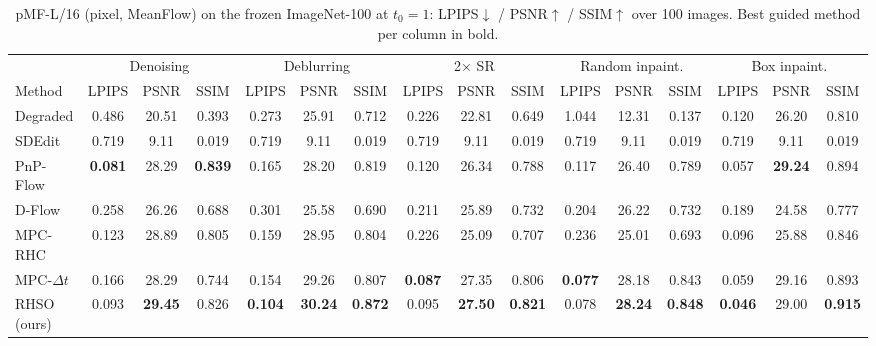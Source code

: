 
\begin{table}[t]
\centering
\small
\setlength{\tabcolsep}{3.5pt}
\caption{pMF-L/16 (pixel, MeanFlow) on the frozen ImageNet-100 at $t_0 = 1$: LPIPS$\downarrow$ / PSNR$\uparrow$ / SSIM$\uparrow$ over 100 images. Best guided method per column in bold.}
\label{tab:final_pmf}
\begin{tabular}{lccccccccccccccc}
\toprule
 & \multicolumn{3}{c}{Denoising} & \multicolumn{3}{c}{Deblurring} & \multicolumn{3}{c}{2$\times$ SR} & \multicolumn{3}{c}{Random inpaint.} & \multicolumn{3}{c}{Box inpaint.} \\
\cmidrule(lr){2-4} \cmidrule(lr){5-7} \cmidrule(lr){8-10} \cmidrule(lr){11-13} \cmidrule(lr){14-16}
Method & LPIPS & PSNR & SSIM & LPIPS & PSNR & SSIM & LPIPS & PSNR & SSIM & LPIPS & PSNR & SSIM & LPIPS & PSNR & SSIM \\
\midrule
Degraded & 0.486 & 20.51 & 0.393 & 0.273 & 25.91 & 0.712 & 0.226 & 22.81 & 0.649 & 1.044 & 12.31 & 0.137 & 0.120 & 26.20 & 0.810 \\
\midrule
SDEdit & 0.719 & 9.11 & 0.019 & 0.719 & 9.11 & 0.019 & 0.719 & 9.11 & 0.019 & 0.719 & 9.11 & 0.019 & 0.719 & 9.11 & 0.019 \\
PnP-Flow & \textbf{0.081} & 28.29 & \textbf{0.839} & 0.165 & 28.20 & 0.819 & 0.120 & 26.34 & 0.788 & 0.117 & 26.40 & 0.789 & 0.057 & \textbf{29.24} & 0.894 \\
D-Flow & 0.258 & 26.26 & 0.688 & 0.301 & 25.58 & 0.690 & 0.211 & 25.89 & 0.732 & 0.204 & 26.22 & 0.732 & 0.189 & 24.58 & 0.777 \\
MPC-RHC & 0.123 & 28.89 & 0.805 & 0.159 & 28.95 & 0.804 & 0.226 & 25.09 & 0.707 & 0.236 & 25.01 & 0.693 & 0.096 & 25.88 & 0.846 \\
MPC-$\Delta t$ & 0.166 & 28.29 & 0.744 & 0.154 & 29.26 & 0.807 & \textbf{0.087} & 27.35 & 0.806 & \textbf{0.077} & 28.18 & 0.843 & 0.059 & 29.16 & 0.893 \\
RHSO (ours) & 0.093 & \textbf{29.45} & 0.826 & \textbf{0.104} & \textbf{30.24} & \textbf{0.872} & 0.095 & \textbf{27.50} & \textbf{0.821} & 0.078 & \textbf{28.24} & \textbf{0.848} & \textbf{0.046} & 29.00 & \textbf{0.915} \\
\bottomrule
\end{tabular}
\end{table}

